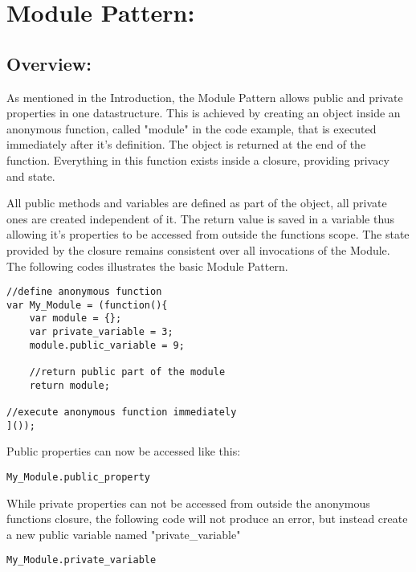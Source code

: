 \documentclass{bioinfo}
\begin{document}
\section{Module Pattern:}


\subsection{Overview:}
As mentioned in the Introduction, the Module Pattern allows public and private properties in one datastructure. This is achieved by creating an object inside an anonymous function, called "module" in the code example, that is executed immediately after it's definition. The object is returned at the end of the function. Everything in this function exists inside a closure, providing privacy and state.  \\

\begin{flushleft}
All public methods and variables are defined as part of the object, all private ones are created independent of it. The return value is saved in a variable thus allowing it's properties to be accessed from outside the functions scope. The state provided by the closure remains consistent over all invocations of the Module. The following codes illustrates the basic Module Pattern.
\end{flushleft}

\vspace{\baselineskip}
\vspace{\baselineskip}
\vspace{\baselineskip}

\begin{lstlisting}
//define anonymous function
var My_Module = (function(){
	var module = {};
	var private_variable = 3;
	module.public_variable = 9;
	
	//return public part of the module
	return module;
	
//execute anonymous function immediately
]());
\end{lstlisting}

Public properties can now be accessed like this:

\begin{lstlisting}
My_Module.public_property
\end{lstlisting}


While private properties can not be accessed from outside the anonymous functions closure, the following code will not produce an error, but instead create a new public variable named "private\_variable"
\begin{lstlisting}
My_Module.private_variable
\end{lstlisting}
\end{document}

